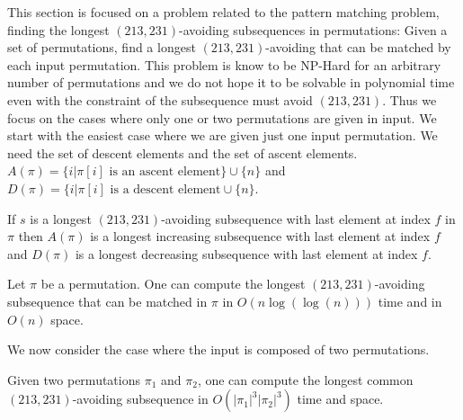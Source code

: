 \documentclass[a4paper]{llncs}
\newcounter{num}
\begin{document}
	This section is focused on a problem related to the pattern matching problem, finding the longest $(213,231)$-avoiding subsequences in permutations:
	Given a set of permutations, find a longest $(213,231)$-avoiding that can be matched
	by each input permutation.
	This problem is know to be NP-Hard for an arbitrary number of permutations and we do not hope it to be solvable in polynomial time even with the constraint of the subsequence must avoid $(213,231)$. Thus we focus on the cases where only one or two permutations are given in input.
	We start with the easiest case where we are given just one input permutation.
	We need the set of descent elements and the set of ascent elements.
	$A(\pi) = \{i | \text{$\pi[i]$ is an ascent element} \} \cup \{n\}$ and
	$D(\pi) = \{i | \text{$\pi[i]$ is a descent element} \cup \{n\}$.\\

	\begin{proposition}
	\label{proposition:longestIncreasingSubsequence}
	If $s$ is a longest $(213,231)$-avoiding subsequence with last element at index 
	$f$ in $\pi$ then
	$A(\pi)$ is a longest increasing subsequence with last element at index $f$ and
	$D(\pi)$ is a longest decreasing subsequence with last element at index $f$.
	\end{proposition}

	\begin{proposition}
	\label{proposition:longest 2}
	Let $\pi$ be a permutation. One can compute
	the longest $(213,231)$-avoiding subsequence that can be matched in $\pi$
	in $O(n\log(\log(n)))$ time and in $O(n)$ space.
	\end{proposition}

We  now consider the case where the input is composed of two permutations.


\begin{proposition}
Given two permutations $\pi_1$ and $\pi_2$,
one can compute 
the longest common $(213,231)$-avoiding subsequence
in $O(|\pi_1|^3|\pi_2|^3)$ time and space.
\end{proposition}
\end{document}
